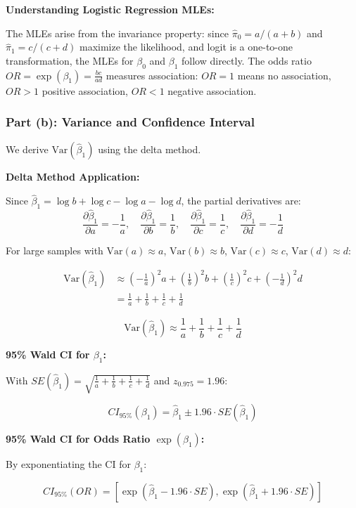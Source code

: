 
\begin{explanation}
\textbf{Understanding Logistic Regression MLEs:}

The MLEs arise from the invariance property: since $\hat{\pi}_0 = a/(a+b)$ and $\hat{\pi}_1 = c/(c+d)$ maximize the likelihood, and logit is a one-to-one transformation, the MLEs for $\beta_0$ and $\beta_1$ follow directly. The odds ratio $OR = \exp(\beta_1) = \frac{bc}{ad}$ measures association: $OR=1$ means no association, $OR>1$ positive association, $OR<1$ negative association.
\end{explanation}

\subsubsection{Part (b): Variance and Confidence Interval}

\begin{solution}
We derive $\text{Var}(\hat{\beta}_1)$ using the delta method.

\textbf{Delta Method Application:}

Since $\hat{\beta}_1 = \log b + \log c - \log a - \log d$, the partial derivatives are:
\[
\frac{\partial \hat{\beta}_1}{\partial a} = -\frac{1}{a}, \quad \frac{\partial \hat{\beta}_1}{\partial b} = \frac{1}{b}, \quad \frac{\partial \hat{\beta}_1}{\partial c} = \frac{1}{c}, \quad \frac{\partial \hat{\beta}_1}{\partial d} = -\frac{1}{d}
\]

For large samples with $\text{Var}(a) \approx a$, $\text{Var}(b) \approx b$, $\text{Var}(c) \approx c$, $\text{Var}(d) \approx d$:

\begin{align*}
\text{Var}(\hat{\beta}_1) &\approx \left(-\frac{1}{a}\right)^2 a + \left(\frac{1}{b}\right)^2 b + \left(\frac{1}{c}\right)^2 c + \left(-\frac{1}{d}\right)^2 d \\
&= \frac{1}{a} + \frac{1}{b} + \frac{1}{c} + \frac{1}{d}
\end{align*}

\[
\boxed{\text{Var}(\hat{\beta}_1) \approx \frac{1}{a} + \frac{1}{b} + \frac{1}{c} + \frac{1}{d}}
\]

\textbf{95\% Wald CI for $\beta_1$:}

With $SE(\hat{\beta}_1) = \sqrt{\frac{1}{a} + \frac{1}{b} + \frac{1}{c} + \frac{1}{d}}$ and $z_{0.975} = 1.96$:

\[
\boxed{CI_{95\%}(\beta_1) = \hat{\beta}_1 \pm 1.96 \cdot SE(\hat{\beta}_1)}
\]

\textbf{95\% Wald CI for Odds Ratio $\exp(\beta_1)$:}

By exponentiating the CI for $\beta_1$:

\[
\boxed{CI_{95\%}(OR) = \left[\exp\left(\hat{\beta}_1 - 1.96 \cdot SE\right), \exp\left(\hat{\beta}_1 + 1.96 \cdot SE\right)\right]}
\]
\end{solution}

